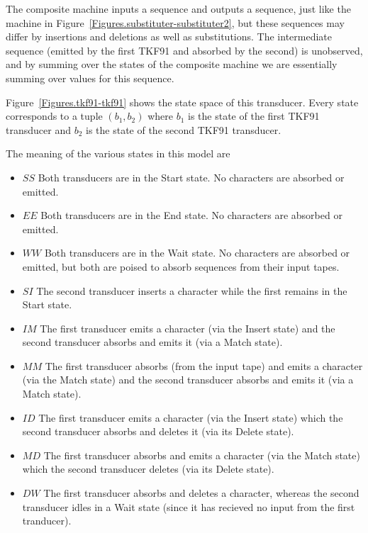 \documentclass{article}
\newcommand{\figref}[1]{Figure~\ref{Figures.#1}}
\begin{document}
The composite machine inputs a sequence and outputs a sequence, just like the machine
in  \figref{substituter-substituter2}, but these sequences may differ by insertions and deletions
as well as substitutions. 
The intermediate sequence (emitted by the first TKF91 and absorbed by the second) is unobserved,
and by summing over the states of the composite machine we are essentially summing over
values for this sequence. 

\figref{tkf91-tkf91} shows the state space of this transducer.  
Every state corresponds to a tuple $(b_1,b_2)$
where
$b_1$ is the state of the first TKF91 transducer and
$b_2$ is the state of the second TKF91 transducer.

The meaning of the various states in this model are
\begin{itemize}
\item $SS$ Both transducers are in the Start state.  No characters are absorbed or emitted.
\item $EE$ Both transducers are in the End state.  No characters are  absorbed or emitted.
\item $WW$ Both transducers are in the Wait state.  No characters are absorbed or emitted, but both are poised to absorb sequences from their input tapes.
\item $SI$ The second transducer inserts a character while the first remains in the Start state. 
\item $IM$ The first transducer  emits a character (via the Insert state) and the second transducer absorbs and emits it (via a Match state). 
\item $MM$ The first transducer  absorbs (from the input tape) and emits a character (via the Match state) and the second transducer absorbs and emits it (via a Match state). 
\item $ID$ The first transducer  emits a character (via the Insert state) which the second transducer absorbs and deletes it (via its Delete state). 
\item $MD$ The first transducer  absorbs and emits a character (via the Match state) which the second transducer deletes (via its Delete state). 
\item $DW$ The first transducer absorbs and deletes a character, whereas the second transducer idles in a Wait state (since it has recieved no input from the first tranducer).  
\end{itemize}
\end{document}
